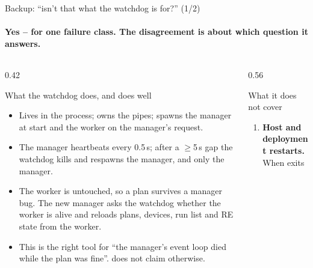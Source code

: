 

\begin{frame}{Backup: ``isn't that what the watchdog is for?'' (1/2)}
    \framesubtitle{Yes -- for one failure class. The disagreement is about which question it answers.}
    \begin{columns}[T]
        \begin{column}{0.42\textwidth}
            \begin{exampleblock}{What the watchdog does, and does well}
                \scriptsize
                \begin{itemize}
                    \item Lives in the  process; owns the pipes; spawns the manager
                          at start and the worker on the manager's request.
                    \item The manager heartbeats every 0.5\,s; after a $\geq$5\,s gap the watchdog kills and
                          respawns the manager, and only the manager.
                    \item The worker is untouched, so a plan survives a manager bug. The new manager asks
                          the watchdog whether the worker is alive and reloads plans, devices, run list and
                          RE state from the worker. 
                    \item This is the right tool for ``the manager's event loop died while the plan was
                          fine''. \vtwo{} does not claim otherwise.
                \end{itemize}
            \end{exampleblock}
        \end{column}
        \begin{column}{0.56\textwidth}
            \begin{alertblock}{What it does not cover}
                \scriptsize
                \begin{enumerate}
                    \item \textbf{Host and deployment restarts.} When  exits

\end{enumerate}
\end{alertblock}
\end{column}
\end{columns}
\end{frame}
